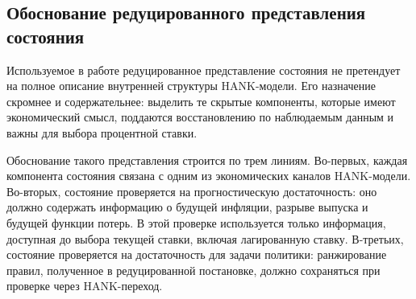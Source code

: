\subsection{Обоснование редуцированного представления состояния}

Используемое в работе редуцированное представление состояния не претендует на полное описание внутренней структуры HANK-модели. Его назначение скромнее и содержательнее: выделить те скрытые компоненты, которые имеют экономический смысл, поддаются восстановлению по наблюдаемым данным и важны для выбора процентной ставки.

Обоснование такого представления строится по трем линиям. Во-первых, каждая компонента состояния связана с одним из экономических каналов HANK-модели. Во-вторых, состояние проверяется на прогностическую достаточность: оно должно содержать информацию о будущей инфляции, разрыве выпуска и будущей функции потерь. В этой проверке используется только информация, доступная до выбора текущей ставки, включая лагированную ставку. В-третьих, состояние проверяется на достаточность для задачи политики: ранжирование правил, полученное в редуцированной постановке, должно сохраняться при проверке через HANK-переход.

\begin{table}[htbp]
\centering
\small
\caption{Экономическая интерпретация компонент редуцированного состояния}
\label{tab:reduced_state_components}

\end{table}

\begin{table}[htbp]
\centering
\small
\caption{Прогностическая достаточность альтернативных представлений состояния}
\label{tab:forecast_sufficiency}

\end{table}

\begin{table}[htbp]
\centering
\small
\caption{Прогностическая достаточность для будущей функции потерь по сценариям}
\label{tab:future_loss_scenario_forecast}

\end{table}

\begin{table}[htbp]
\centering
\small
\caption{Сохранение ранжирования правил при проверке через HANK-переход}
\label{tab:policy_ranking_validation}

\end{table}

